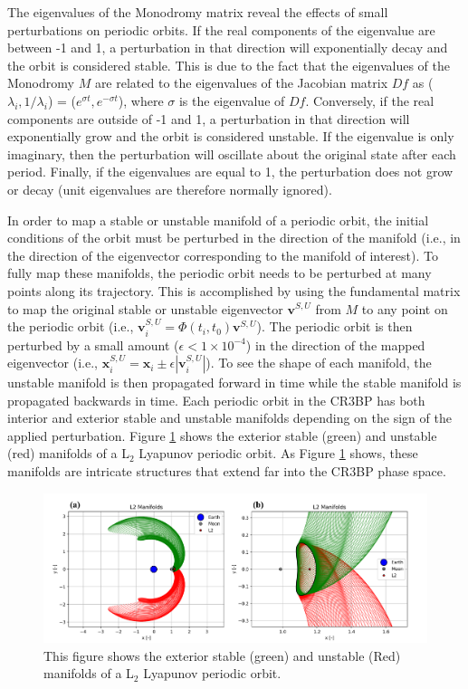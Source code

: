\documentclass[11pt]{article} %
\begin{document}
\noindent
The eigenvalues of the Monodromy matrix reveal the effects of small perturbations on periodic orbits. If the real components of the eigenvalue are between -1 and 1, a perturbation in that direction will exponentially decay and the orbit is considered stable. This is due to the fact that the eigenvalues of the Monodromy $M$ are related to the eigenvalues of the Jacobian matrix $Df$ as ($\lambda_i,1/\lambda_i$) = ($e^{\sigma t}, e^{-\sigma t}$), where $\sigma$ is the eigenvalue of $Df$. Conversely, if the real components are outside of -1 and 1, a perturbation in that direction will exponentially grow and the orbit is considered unstable. If the eigenvalue is only imaginary, then the perturbation will oscillate about the original state after each period. Finally, if the eigenvalues are equal to 1, the perturbation does not grow or decay (unit eigenvalues are therefore normally ignored).

In order to map a stable or unstable manifold of a periodic orbit, the initial conditions of the orbit must be perturbed in the direction of the manifold (i.e., in the direction of the eigenvector corresponding to the manifold of interest). To fully map these manifolds, the periodic orbit needs to be perturbed at many points along its trajectory. This is accomplished by using the fundamental matrix to map the original stable or unstable eigenvector $\bm{v}^{S,U}$ from $M$ to any point on the periodic orbit (i.e., $\bm{v}_i^{S,U}=\Phi\left(t_i,t_0\right)\bm{v}^{S,U}$). The periodic orbit is then perturbed by a small amount ($\epsilon < 1\times10^{-4}$) in the direction of the mapped eigenvector (i.e., $\bm{x}_{i}^{S,U}=\bm{x}_{i}\pm\epsilon|\bm{v}_i^{S,U}|$). To see the shape of each manifold, the unstable manifold is then propagated forward in time while the stable manifold is propagated backwards in time. Each periodic orbit in the CR3BP has both interior and exterior stable and unstable manifolds depending on the sign of the applied perturbation. Figure \ref{f:manifolds} shows the exterior stable (green) and unstable (red) manifolds of a L$_2$ Lyapunov periodic orbit. As Figure \ref{f:manifolds} shows, these manifolds are intricate structures that extend far into the CR3BP phase space. 

\begin{figure}[H]
    \centering
    \includegraphics[width=\textwidth]{manifold_comb.png}
    \caption{This figure shows the exterior stable (green) and unstable (Red) manifolds of a L$_2$ Lyapunov periodic orbit.}
    \label{f:manifolds}
\end{figure}
\end{document}
